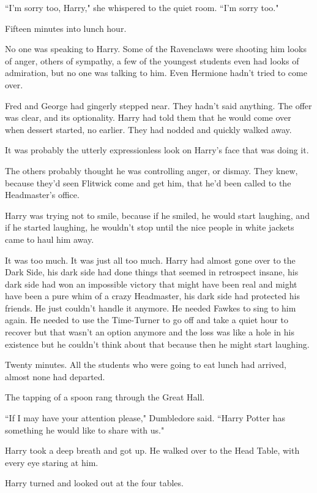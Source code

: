 ``I'm sorry too, Harry," she whispered to the quiet room. ``I'm sorry too."

\later

Fifteen minutes into lunch hour.

No one was speaking to Harry. Some of the Ravenclaws were shooting him looks of anger, others of sympathy, a few of the youngest students even had looks of admiration, but no one was talking to him. Even Hermione hadn't tried to come over.

Fred and George had gingerly stepped near. They hadn't said anything. The offer was clear, and its optionality. Harry had told them that he would come over when dessert started, no earlier. They had nodded and quickly walked away.

It was probably the utterly expressionless look on Harry's face that was doing it.

The others probably thought he was controlling anger, or dismay. They knew, because they'd seen Flitwick come and get him, that he'd been called to the Headmaster's office.

Harry was trying not to smile, because if he smiled, he would start laughing, and if he started laughing, he wouldn't stop until the nice people in white jackets came to haul him away.

It was too much. It was just all too much. Harry had almost gone over to the Dark Side, his dark side had done things that seemed in retrospect insane, his dark side had won an impossible victory that might have been real and might have been a pure whim of a crazy Headmaster, his dark side had protected his friends. He just couldn't handle it anymore. He needed Fawkes to sing to him again. He needed to use the Time-Turner to go off and take a quiet hour to recover but that wasn't an option anymore and the loss was like a hole in his existence but he couldn't think about that because then he might start laughing.

Twenty minutes. All the students who were going to eat lunch had arrived, almost none had departed.

The tapping of a spoon rang through the Great Hall.

``If I may have your attention please," Dumbledore said. ``Harry Potter has something he would like to share with us."

Harry took a deep breath and got up. He walked over to the Head Table, with every eye staring at him.

Harry turned and looked out at the four tables.

